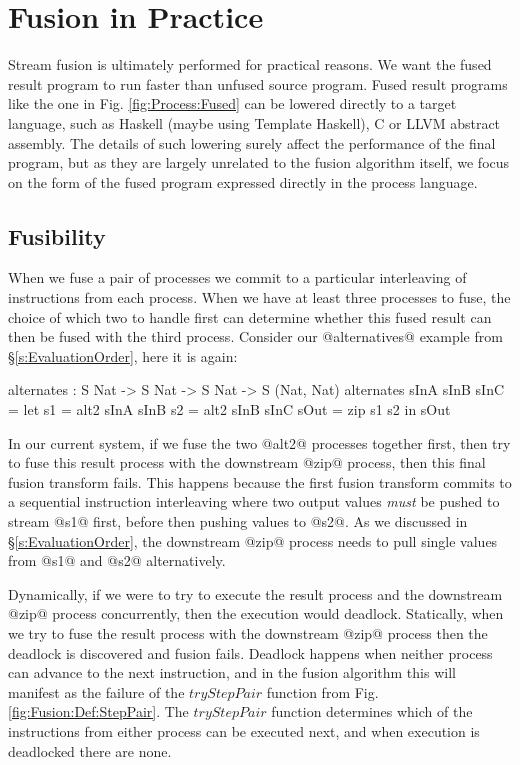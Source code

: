 
\section{Fusion in Practice}
\label{s:Evaluation}

Stream fusion is ultimately performed for practical reasons. We want the fused result program to run faster than unfused source program. Fused result programs like the one in Fig. \ref{fig:Process:Fused} can be lowered directly to a target language, such as Haskell (maybe using Template Haskell), C or LLVM abstract assembly. The details of such lowering surely affect the performance of the final program, but as they are largely unrelated to the fusion algorithm itself, we focus on the form of the fused program expressed directly in the process language.


\subsection{Fusibility}
\label{s:FusionOrder}
When we fuse a pair of processes we commit to a particular interleaving of instructions from each process. When we have at least three processes to fuse, the choice of which two to handle first can determine whether this fused result can then be fused with the third process. Consider our @alternatives@ example from \S\ref{s:EvaluationOrder}, here it is again:
\begin{code}
  alternates : S Nat -> S Nat -> S Nat -> S (Nat, Nat)
  alternates sInA sInB sInC
   = let  s1   = alt2 sInA sInB
          s2   = alt2 sInB sInC
          sOut = zip s1 s2
     in   sOut
\end{code}

In our current system, if we fuse the two @alt2@ processes together first, then try to fuse this result process with the downstream @zip@ process, then this final fusion transform fails. This happens because the first fusion transform commits to a sequential instruction interleaving where two output values \emph{must} be pushed to stream @s1@ first, before then pushing values to @s2@. As we discussed in \S\ref{s:EvaluationOrder}, the downstream @zip@ process needs to pull single values from @s1@ and @s2@ alternatively.

Dynamically, if we were to try to execute the result process and the downstream @zip@ process concurrently, then the execution would deadlock. Statically, when we try to fuse the result process with the downstream @zip@ process then the deadlock is discovered and fusion fails. Deadlock happens when neither process can advance to the next instruction, and in the fusion algorithm this will manifest as the failure of the $tryStepPair$ function from Fig.\ref{fig:Fusion:Def:StepPair}. The $tryStepPair$ function determines which of the instructions from either process can be executed next, and when execution is deadlocked there are none.

